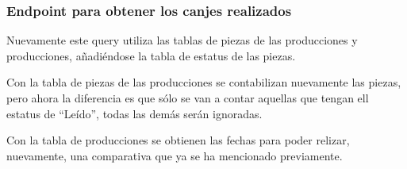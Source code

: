 \subsubsection{Endpoint para obtener los canjes realizados}
Nuevamente este query utiliza las tablas de piezas de las producciones y producciones, añadiéndose la tabla de estatus de las piezas.

Con la tabla de piezas de las producciones se contabilizan nuevamente las piezas, pero ahora la diferencia es que sólo se van a contar aquellas que tengan ell estatus de ``Leído'', todas las demás serán ignoradas.

Con la tabla de producciones se obtienen las fechas para poder relizar, nuevamente, una comparativa que ya se ha mencionado previamente.